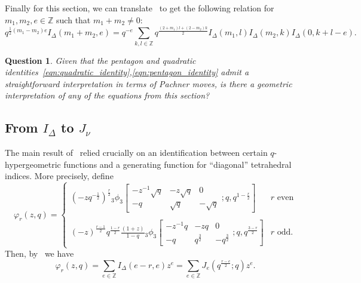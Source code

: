 \documentclass[11pt]{amsart}
\newtheorem{ques}[thm]{Question}
\newcommand{\Z}{\mathbb{Z}}
\newcommand{\tet}{I_{\Delta}}
\begin{document}
Finally for this section, we can translate~\cite[Cor.~2]{rubin2002toeplitz}
to get the following relation for $m_1,m_2,e \in \Z$ such that $m_1 +m_2\neq 0$:
\begin{equation}\label{eqn:1to3}
q^{\frac12 \left(m_1 - m_2\right)e} \tet\left(m_1+m_2,e\right) = q^{-e} \sum_{k,l \in \Z} q^{\frac{\left(2+ m_1 \right)l + \left(2- m_2\right) k}{2}} \tet \left(m_1,l\right) \tet \left(m_2,k\right) \tet \left(0,k+l-e\right).
\end{equation}

\begin{ques}
Given that the pentagon and quadratic identities~\eqref{eqn:quadratic_identity},\eqref{eqn:pentagon_identity} admit a straightforward interpretation in terms of Pachner moves, is there a geometric interpretation of any of the equations from this section?
\end{ques}






\subsection{From $\tet$ to $J_\nu$ }

The main result of~\cite{3dindexdehn} relied crucially on an identification between certain $q$-hypergeometric functions and a generating function for ``diagonal'' tetrahedral indices. More precisely, define
\begin{equation}\label{eqn:phi_expression}
\varphi_r\left(z,q\right) =
\begin{cases}
\left(-z q^{-\frac12}\right)^{\frac{r}{2}} {_3\phi_3} \left[\begin{matrix} -z^{-1} \sqrt{q} &  -z\sqrt{q}  & 0\\
-q & \sqrt{q} & -\sqrt{q}
 \end{matrix}
; q, q^{1-\frac{r}{2}} \right]   & r \text{ even}\\
~\\
\left(-z\right)^{\frac{r-1}{2}} q^{\frac{1-r}{2}}
\frac{\left(1+z\right)}{1-q} {_3\phi_3} \left[\begin{matrix} -z^{-1} q   & -z q  & 0\\
-q & q^\frac{3}{2} & -q^{\frac{3}{2}}
 \end{matrix}
; q, q^{\frac{3-r}{2}} \right]   & r \text{ odd.}
\end{cases}
\end{equation}
Then, by~\cite[Sec.~10]{3dindexdehn} we have
\begin{equation}\label{eqn:seriesindexshifted}
\varphi_r\left(z,q\right) = \sum_{e \in \Z}  I_\Delta \left(e-r,e\right) z^e = \sum_{e \in \Z} J_e \left(q^{\frac{r-e}{2}};q\right) z^e.
\end{equation}
\end{document}
